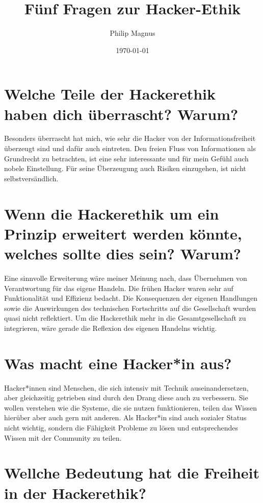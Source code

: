 \documentclass[12pt]{article}
\title{Fünf Fragen zur Hacker-Ethik}
\author{Philip Magnus}
\date{\today}
\begin{document}
\maketitle

\section{Welche Teile der Hackerethik haben dich überrascht? Warum?}

Besonders überrascht hat mich, wie sehr die Hacker von der Informationsfreiheit überzeugt sind und dafür auch eintreten. Den freien Fluss von Informationen als Grundrecht zu betrachten, ist eine sehr interessante 
und für mein Gefühl auch nobele Einstellung. Für seine Überzeugung auch Risiken einzugehen, ist nicht selbstversändlich.

\section{Wenn die Hackerethik um ein Prinzip erweitert werden könnte, welches sollte dies sein? Warum?}

Eine sinnvolle Erweiterung wäre meiner Meinung nach, dass Übernehmen von Verantwortung für das eigene Handeln. Die frühen Hacker waren sehr auf Funktionalität und Effizienz bedacht. Die Konsequenzen der eigenen Handlungen
sowie die Auswirkungen des technischen Fortschritts auf die Gesellschaft wurden quasi nicht reflektiert. Um die Hackerethik mehr in die Gesamtgesellschaft zu integrieren, wäre gerade die Reflexion des eigenen Handelns wichtig.

\section{Was macht eine Hacker*in aus?}

Hacker*innen sind Menschen, die sich intensiv mit Technik auseinandersetzen, aber gleichzeitig getrieben sind durch den Drang diese auch zu verbessern. Sie wollen verstehen wie die Systeme, die sie nutzen funktionieren,
teilen das Wissen hierüber aber auch gern mit anderen. Als Hacker*in sind auch sozialer Status nicht wichtig, sondern die Fähigkeit Probleme zu lösen und entsprechendes Wissen mit der Community zu teilen.

\section{Wellche Bedeutung hat die Freiheit in der Hackerethik?}
\end{document}

